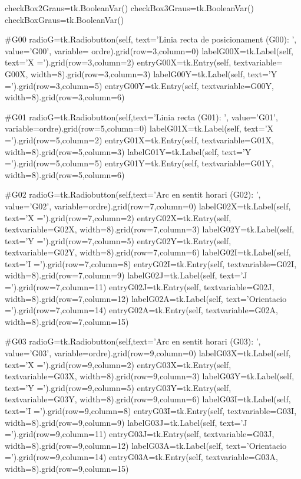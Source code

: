 \begin{python}
			checkBox2Graus=tk.BooleanVar() 
			checkBox3Graus=tk.BooleanVar()
			checkBoxGraus=tk.BooleanVar()
			
			
			
			#G00
			radioG=tk.Radiobutton(self, text='Linia recta de posicionament (G00): ', value='G00', variable= ordre).grid(row=3,column=0)
			labelG00X=tk.Label(self, text='X =').grid(row=3,column=2)
			entryG00X=tk.Entry(self, textvariable= G00X, width=8).grid(row=3,column=3)
			labelG00Y=tk.Label(self, text='Y =').grid(row=3,column=5)
			entryG00Y=tk.Entry(self, textvariable=G00Y, width=8).grid(row=3,column=6)
			
			
			
			
			#G01
			radioG=tk.Radiobutton(self,text='Linia recta (G01): ', value='G01', variable=ordre).grid(row=5,column=0)
			labelG01X=tk.Label(self, text='X =').grid(row=5,column=2)
			entryG01X=tk.Entry(self, textvariable=G01X, width=8).grid(row=5,column=3)
			labelG01Y=tk.Label(self, text='Y =').grid(row=5,column=5)
			entryG01Y=tk.Entry(self, textvariable=G01Y, width=8).grid(row=5,column=6)
			
			
			
			
			#G02
			radioG=tk.Radiobutton(self,text='Arc en sentit horari (G02): ', value='G02', variable=ordre).grid(row=7,column=0)
			labelG02X=tk.Label(self, text='X =').grid(row=7,column=2)
			entryG02X=tk.Entry(self, textvariable=G02X, width=8).grid(row=7,column=3)
			labelG02Y=tk.Label(self, text='Y =').grid(row=7,column=5)
			entryG02Y=tk.Entry(self, textvariable=G02Y, width=8).grid(row=7,column=6)
			labelG02I=tk.Label(self, text='I =').grid(row=7,column=8)
			entryG02I=tk.Entry(self, textvariable=G02I, width=8).grid(row=7,column=9)
			labelG02J=tk.Label(self, text='J =').grid(row=7,column=11)
			entryG02J=tk.Entry(self, textvariable=G02J, width=8).grid(row=7,column=12)
			labelG02A=tk.Label(self, text='Orientacio =').grid(row=7,column=14)
			entryG02A=tk.Entry(self, textvariable=G02A, width=8).grid(row=7,column=15)
			
			
			
			
			
			
			#G03
			radioG=tk.Radiobutton(self,text='Arc en sentit horari (G03): ', value='G03', variable=ordre).grid(row=9,column=0)
			labelG03X=tk.Label(self, text='X =').grid(row=9,column=2)
			entryG03X=tk.Entry(self, textvariable=G03X, width=8).grid(row=9,column=3)
			labelG03Y=tk.Label(self, text='Y =').grid(row=9,column=5)
			entryG03Y=tk.Entry(self, textvariable=G03Y, width=8).grid(row=9,column=6)
			labelG03I=tk.Label(self, text='I =').grid(row=9,column=8)
			entryG03I=tk.Entry(self, textvariable=G03I, width=8).grid(row=9,column=9)
			labelG03J=tk.Label(self, text='J =').grid(row=9,column=11)
			entryG03J=tk.Entry(self, textvariable=G03J, width=8).grid(row=9,column=12)
			labelG03A=tk.Label(self, text='Orientacio =').grid(row=9,column=14)
			entryG03A=tk.Entry(self, textvariable=G03A, width=8).grid(row=9,column=15)
			

\end{python}
